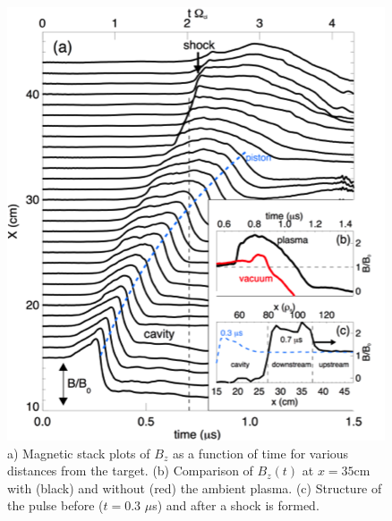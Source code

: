 \documentclass[11pt]{article}
\begin{document}
\begin{figure}[!htbp]
\centerline{\includegraphics[width=3.0truein]{shock1}}
\caption{a) Magnetic stack plots of $B_{z}$ as a function of time for
  various distances from the target. (b) Comparison of $B_z(t)$ at $x
  = 35$cm with (black) and without (red) the ambient plasma. (c) Structure
  of the pulse before ($t = 0.3$ $\mu$s) and after a shock is formed.}\label{shock1}
\end{figure}
\end{document}
